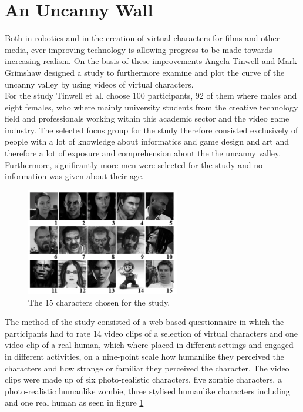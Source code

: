 \section{An Uncanny Wall}
Both in robotics and in the creation of virtual characters for films and other media, ever-improving technology is allowing progress to be made towards increasing realism. On the basis of these improvements Angela Tinwell and Mark Grimshaw \cite{uncanny_wall} designed a study to furthermore examine and plot the curve of the uncanny valley by using videos of virtual characters.\\
For the study Tinwell et al. choose 100 participants, 92 of them where males and eight females, who where mainly university students from the creative technology field and professionals working within this academic sector and the video game industry. The selected focus group for the study therefore consisted exclusively of people with a lot of knowledge about informatics and game design and art and therefore a lot of exposure and comprehension about the the uncanny valley. Furthermore, significantly more men were selected for the study and no information was given about their age. 
\begin{figure} %
    \centering
    \includegraphics[width=0.6\textwidth]{graphics/uncanny_wall.png}
    \caption{The 15 characters chosen for the study.}
    \label{fig:uncannyWall}
\end{figure}
The method of the study consisted of a web based questionnaire in which the participants had to rate 14 video clips of a selection of virtual characters and one video clip of a real human, which where placed in different settings and engaged in different activities, on a nine-point scale how humanlike they perceived the characters and how strange or familiar they perceived the character. The video clips were made up of six photo-realistic characters, five zombie characters, a photo-realistic humanlike zombie, three stylised humanlike characters including and one real human as seen in figure \ref{fig:uncannyWall}\\
